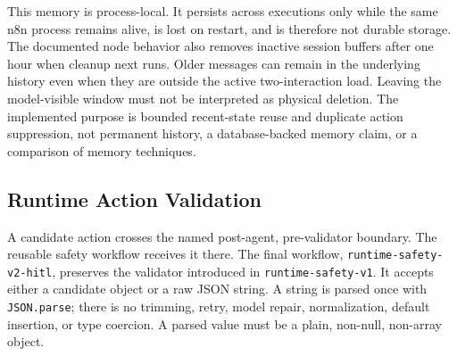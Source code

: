 This memory is process-local. It persists across executions only while the
same n8n process remains alive, is lost on restart, and is therefore not
durable storage. The documented node behavior also removes inactive session
buffers after one hour when cleanup next runs. Older messages can remain in
the underlying history even when they are outside the active two-interaction
load. Leaving the model-visible window must not be interpreted as physical
deletion. The implemented purpose is bounded recent-state reuse and duplicate
action suppression, not permanent history, a database-backed memory claim, or
a comparison of memory techniques.

\subsection{Runtime Action Validation}\label{subsec:impl-validator}

A candidate action crosses the named post-agent, pre-validator boundary. The
reusable safety workflow receives it there. The final workflow,
\texttt{runtime-safety-v2-hitl}, preserves the validator introduced in
\texttt{runtime-safety-v1}. It accepts either a candidate object or a raw JSON
string. A string is parsed once with \texttt{JSON.parse}; there is no trimming,
retry, model repair, normalization, default insertion, or type coercion. A
parsed value must be a plain, non-null, non-array object.

